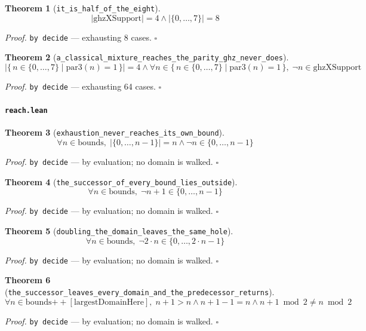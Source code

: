 \documentclass[11pt]{article}
\newtheorem{theorem}{Theorem}[section]
\begin{document}
\begin{theorem}[\texttt{it\_is\_half\_of\_the\_eight}]
\[ \left|\mathrm{ghzXSupport}\right| = 4 \land \left|\{0,\dots,7\}\right| = 8 \]
\end{theorem}
\noindent\emph{Proof.} \texttt{by decide} --- exhausting 8 cases. \hfill$\square$

\begin{theorem}[\texttt{a\_classical\_mixture\_reaches\_the\_parity\_ghz\_never\_does}]
\[ \left|\{\, n \in \{0,\dots,7\} \mid \mathrm{par3}\mathopen{}\left(n\right) = 1 \,\}\right| = 4 \land \forall n \in \{\, n \in \{0,\dots,7\} \mid \mathrm{par3}\mathopen{}\left(n\right) = 1 \,\},\; \lnot n \in \mathrm{ghzXSupport} \]
\end{theorem}
\noindent\emph{Proof.} \texttt{by decide} --- exhausting 64 cases. \hfill$\square$

\paragraph{\texttt{reach.lean}}

\begin{theorem}[\texttt{exhaustion\_never\_reaches\_its\_own\_bound}]
\[ \forall n \in \mathrm{bounds},\; \left|\{0,\dots,n-1\}\right| = n \land \lnot n \in \{0,\dots,n-1\} \]
\end{theorem}
\noindent\emph{Proof.} \texttt{by decide} --- by evaluation; no domain is walked. \hfill$\square$

\begin{theorem}[\texttt{the\_successor\_of\_every\_bound\_lies\_outside}]
\[ \forall n \in \mathrm{bounds},\; \lnot n + 1 \in \{0,\dots,n-1\} \]
\end{theorem}
\noindent\emph{Proof.} \texttt{by decide} --- by evaluation; no domain is walked. \hfill$\square$

\begin{theorem}[\texttt{doubling\_the\_domain\_leaves\_the\_same\_hole}]
\[ \forall n \in \mathrm{bounds},\; \lnot 2 \cdot n \in \{0,\dots,2 \cdot n-1\} \]
\end{theorem}
\noindent\emph{Proof.} \texttt{by decide} --- by evaluation; no domain is walked. \hfill$\square$

\begin{theorem}[\texttt{the\_successor\_leaves\_every\_domain\_and\_the\_predecessor\_returns}]
\[ \forall n \in \mathrm{bounds} \mathbin{+\!\!+} [\mathrm{largestDomainHere}],\; n + 1 > n \land n + 1 - 1 = n \land n + 1 \bmod 2 \neq n \bmod 2 \]
\end{theorem}
\noindent\emph{Proof.} \texttt{by decide} --- by evaluation; no domain is walked. \hfill$\square$
\end{document}
